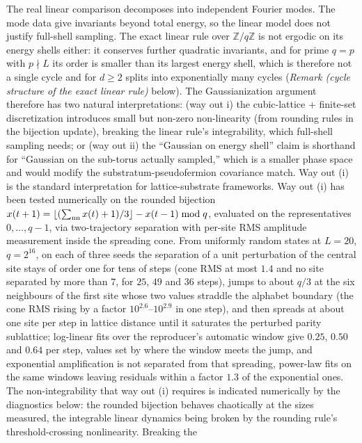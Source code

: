 \documentclass[
]{article}
\begin{document}
The real linear comparison decomposes into independent Fourier modes.
The mode data give invariants beyond total energy, so the linear model
does not justify full-shell sampling. The exact linear rule over
\(\mathbb{Z}/q\mathbb{Z}\) is not ergodic on its energy shells either:
it conserves further quadratic invariants, and for prime \(q=p\) with
\(p\nmid L\) its order is smaller than its largest energy shell, which
is therefore not a single cycle and for \(d\ge2\) splits into
exponentially many cycles (\emph{Remark (cycle structure of the exact
linear rule)} below). The Gaussianization argument therefore has two
natural interpretations: (way out i) the cubic-lattice + finite-set
discretization introduces small but non-zero non-linearity (from
rounding rules in the bijection update), breaking the linear rule's
integrability, which full-shell sampling needs; or (way out ii) the
``Gaussian on energy shell'' claim is shorthand for ``Gaussian on the
sub-torus actually sampled,'' which is a smaller phase space and would
modify the substratum-pseudofermion covariance match. Way out (i) is the
standard interpretation for lattice-substrate frameworks. Way out (i)
has been tested numerically on the rounded bijection
\(x(t+1)=\lfloor(\sum_{\rm nn}x(t)+1)/3\rfloor-x(t-1) \bmod q\),
evaluated on the representatives \(0,\dots,q-1\), via two-trajectory
separation with per-site RMS amplitude measurement inside the spreading
cone. From uniformly random states at \(L=20\), \(q=2^{16}\), on each of
three seeds the separation of a unit perturbation of the central site
stays of order one for tens of steps (cone RMS at most \(1.4\) and no
site separated by more than \(7\), for \(25\), \(49\) and \(36\) steps),
jumps to about \(q/3\) at the six neighbours of the first site whose two
values straddle the alphabet boundary (the cone RMS rising by a factor
\(10^{2.6}\)--\(10^{2.9}\) in one step), and then spreads at about one
site per step in lattice distance until it saturates the perturbed
parity sublattice; log-linear fits over the reproducer's automatic
window give \(0.25\), \(0.50\) and \(0.64\) per step, values set by
where the window meets the jump, and exponential amplification is not
separated from that spreading, power-law fits on the same windows
leaving residuals within a factor \(1.3\) of the exponential ones. The
non-integrability that way out (i) requires is indicated numerically by
the diagnostics below: the rounded bijection behaves chaotically at the
sizes measured, the integrable linear dynamics being broken by the
rounding rule's threshold-crossing nonlinearity. Breaking the
\end{document}
